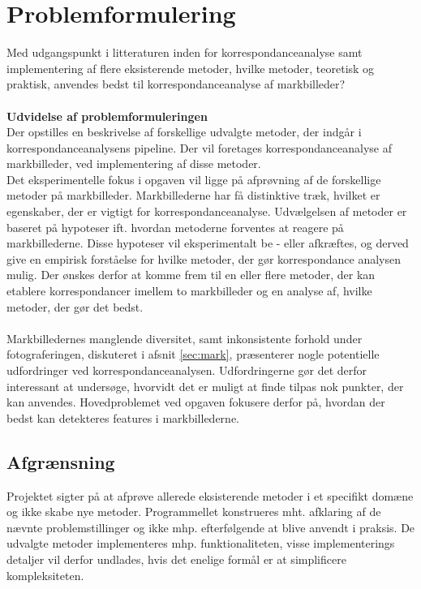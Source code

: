 \section{Problemformulering} \label{subsec:form}
Med udgangspunkt i litteraturen inden for
korrespondanceanalyse samt implementering af
flere eksisterende metoder, hvilke metoder, teoretisk og praktisk, anvendes bedst til korrespondanceanalyse af markbilleder? \\ \\
\textbf{Udvidelse af problemformuleringen} \\
Der opstilles en beskrivelse af forskellige udvalgte metoder, der indgår i korrespondanceanalysens pipeline. Der vil foretages korrespondanceanalyse af markbilleder, ved implementering af disse metoder. \\
Det eksperimentelle fokus i opgaven vil ligge på afprøvning af de forskellige metoder på markbilleder. Markbillederne har få distinktive træk, hvilket er egenskaber, der er vigtigt for korrespondanceanalyse. Udvælgelsen af metoder er baseret på hypoteser ift. hvordan metoderne forventes at reagere på markbillederne. Disse hypoteser vil eksperimentalt be - eller afkræftes, og derved give en empirisk forståelse for hvilke metoder, der gør korrespondance analysen mulig. Der ønskes derfor at komme frem til en eller flere metoder, der kan etablere korrespondancer imellem to markbilleder og en analyse af, hvilke metoder, der gør det bedst.
\\ \\
Markbilledernes manglende diversitet, samt inkonsistente forhold under fotograferingen, diskuteret i afsnit \ref{sec:mark}, præsenterer nogle potentielle udfordringer ved korrespondanceanalysen. Udfordringerne gør det derfor interessant at undersøge, hvorvidt det er muligt at finde tilpas nok punkter, der kan anvendes. Hovedproblemet ved opgaven fokusere derfor på, hvordan der bedst kan detekteres features i markbillederne.
\subsection{Afgrænsning} \label{subsec:afg}
Projektet sigter på at afprøve allerede eksisterende metoder i et specifikt domæne og ikke
skabe nye metoder. Programmellet konstrueres mht. afklaring af de nævnte problemstillinger
og ikke mhp. efterfølgende at blive anvendt i praksis. De udvalgte metoder implementeres mhp. funktionaliteten, visse implementerings detaljer vil derfor undlades, hvis det enelige formål er at simplificere kompleksiteten.